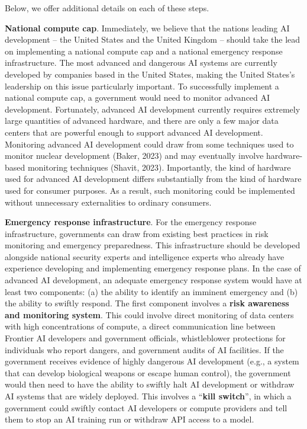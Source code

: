 \documentclass[12pt,a4paper]{article}
\begin{document}
Below, we offer additional details on each of these steps.

\textbf{National compute cap}. Immediately, we believe that the nations leading AI development – the United States and the United Kingdom – should take the lead on implementing a national compute cap and a national emergency response infrastructure. The most advanced and dangerous AI systems are currently developed by companies based in the United States, making the United States’s leadership on this issue particularly important. To successfully implement a national compute cap, a government would need to monitor advanced AI development. Fortunately, advanced AI development currently requires extremely large quantities of advanced hardware, and there are only a few major data centers that are powerful enough to support advanced AI development. Monitoring advanced AI development could draw from some techniques used to monitor nuclear development (Baker, 2023) and may eventually involve hardware-based monitoring techniques (Shavit, 2023). Importantly, the kind of hardware used for advanced AI development differs substantially from the kind of hardware used for consumer purposes. As a result, such monitoring could be implemented without unnecessary externalities to ordinary consumers. 

\textbf{Emergency response infrastructure}. For the emergency response infrastructure, governments can draw from existing best practices in risk monitoring and emergency preparedness. This infrastructure should be developed alongside national security experts and intelligence experts who already have experience developing and implementing emergency response plans. In the case of advanced AI development, an adequate emergency response system would have at least two components: (a) the ability to identify an imminent emergency and (b) the ability to swiftly respond. The first component involves a \textbf{risk awareness}\textbf{ and monitoring system}. This could involve direct monitoring of data centers with high concentrations of compute, a direct communication line between Frontier AI developers and government officials, whistleblower protections for individuals who report dangers, and government audits of AI facilities. If the government receives evidence of highly dangerous AI development (e.g., a system that can develop biological weapons or escape human control), the government would then need to have the ability to swiftly halt AI development or withdraw AI systems that are widely deployed. This involves a “\textbf{kill switch}”, in which a government could swiftly contact AI developers or compute providers and tell them to stop an AI training run or withdraw API access to a model. 
\end{document}
